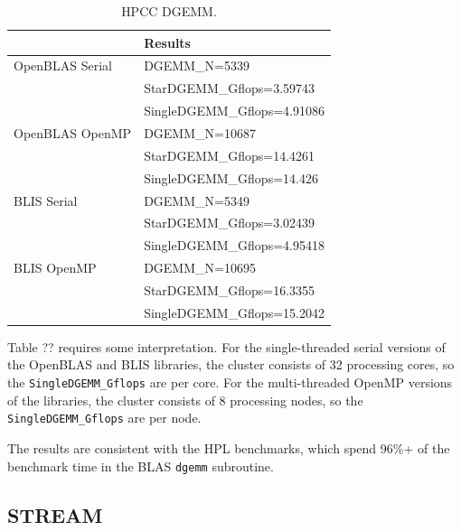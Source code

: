 \documentclass{report}
\begin{document}
\begin{table}[H]
\begin{center}
\begin{tabular}{ |l|l| } 
\hline
                & Results \\ 
\hline
OpenBLAS Serial & DGEMM\_N=5339 \\
                & StarDGEMM\_Gflops=3.59743 \\
                & SingleDGEMM\_Gflops=4.91086 \\
\hline
OpenBLAS OpenMP & DGEMM\_N=10687 \\
                & StarDGEMM\_Gflops=14.4261 \\
                & SingleDGEMM\_Gflops=14.426 \\
\hline
BLIS Serial     & DGEMM\_N=5349 \\
                & StarDGEMM\_Gflops=3.02439 \\
                & SingleDGEMM\_Gflops=4.95418 \\
\hline
BLIS OpenMP     & DGEMM\_N=10695 \\
                & StarDGEMM\_Gflops=16.3355 \\
                & SingleDGEMM\_Gflops=15.2042 \\
\hline
\end{tabular}
\end{center}
\caption{\label{tab:table-name}HPCC DGEMM.}
\end{table}

Table ?? requires some interpretation. For the single-threaded serial versions of the OpenBLAS and BLIS libraries, the cluster consists of 32 processing cores, so the \verb|SingleDGEMM_Gflops| are per core. For the multi-threaded OpenMP versions of the libraries, the cluster consists of 8 processing nodes, so the \verb|SingleDGEMM_Gflops| are per node.

The results are consistent with the HPL benchmarks, which spend 96\%+ of the benchmark time in the BLAS \verb|dgemm| subroutine. 


%
%
\subsection{STREAM}
\end{document}
